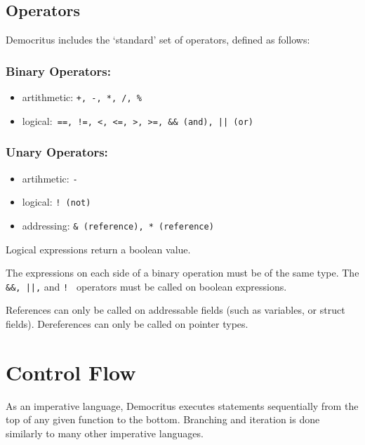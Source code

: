 	\iffalse
	\subsection{Modifiers}
		Information about atomic and pointers here.
	\fi

 	\subsection{Operators}
		
		Democritus includes the `standard' set of operators, defined as follows:

		\subsubsection{Binary Operators:}
		\begin{itemize}
			\item artithmetic: \texttt{+, -, *, /, \%}
			\item logical:\verb^ ==, !=, <, <=, >, >=, && (and), || (or) ^ 
		\end{itemize}

		\subsubsection{Unary Operators:}
		\begin{itemize}
			\item artihmetic: \texttt{-}
			\item logical: \texttt{! (not)}
			\item addressing: \texttt{\& (reference), * (reference)}
		\end{itemize}

		\noindent
		Logical expressions return a boolean value.

		\medskip \noindent
		The expressions on each side of a binary operation must be of the same type. The \verb^ &&, ||,^ and \verb^! ^ operators must be called on boolean expressions.

		\medskip \noindent
		References can only be called on addressable fields (such as variables, or struct fields). Dereferences can only be called on pointer types.


\section{Control Flow}
	As an imperative language, Democritus executes statements sequentially from the top of any given function to the bottom. Branching and iteration is done similarly to many other imperative languages.


